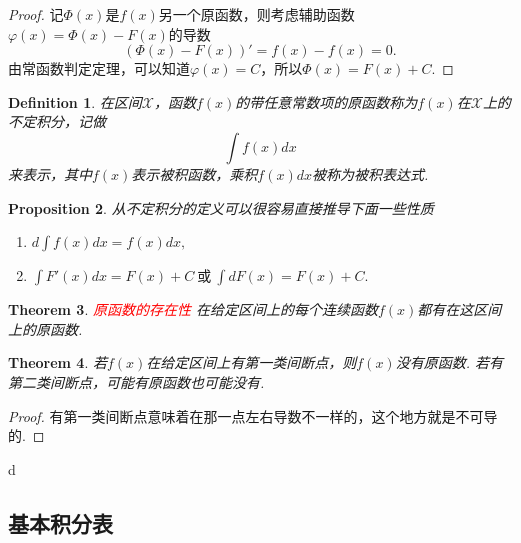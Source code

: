 \documentclass{article}
\newtheorem{theorem}{Theorem}[section]
\newtheorem{proposition}[theorem]{Proposition}
\newtheorem{definition}[theorem]{Definition}
\newcommand{\redt}[1]{\textcolor{red}{#1}}
\begin{document}
\begin{proof}
记$\Phi(x)$是$f(x)$另一个原函数，则考虑辅助函数$\varphi(x) = \Phi(x) - F(x)$的导数
$$
(\Phi(x)-F(x))' = f(x)-f(x) = 0.
$$
由常函数判定定理，可以知道$\varphi(x) = C$，所以$\Phi(x) = F(x) + C$.
\end{proof}

\begin{definition}
\rm 在区间$\mathcal{X}$，函数$f(x)$的带任意常数项的原函数称为$f(x)$在$\mathcal{X}$上的{\color{red}不定积分}，记做
$$
\int f(x)dx
$$
来表示，其中$f(x)$表示{\color{red}被积函数}，乘积$f(x)dx$被称为{\color{red}被积表达式}.
\end{definition}

\begin{proposition}
\rm 从不定积分的定义可以很容易直接推导下面一些性质
\begin{enumerate}
	\item $d\int f(x)dx = f(x)dx,$
	\item $\int F'(x)dx = F(x)+C~\text{或}~\int dF(x) = F(x)+C.$
\end{enumerate}
\end{proposition}

\begin{theorem}
\rm \redt{原函数的存在性} 在给定区间上的每个连续函数$f(x)$都有在这区间上的原函数.
\end{theorem}

\begin{theorem}
\rm 若$f(x)$在给定区间上有第一类间断点，则$f(x)$没有原函数. 若有第二类间断点，可能有原函数也可能没有.  
\end{theorem}

\begin{proof}
有第一类间断点意味着在那一点左右导数不一样的，这个地方就是不可导的. 
\end{proof}

\newpage
d\subsection{基本积分表}
\end{document}
